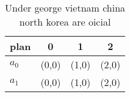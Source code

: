 \documentclass[a4paper]{article}
\begin{document}
\begin{table}
\begin{adjustbox}{width=0.6\columnwidth}
\begin{tabular}{|l|l|l|l|}
\hline
\textbf{plan} & \multicolumn{1}{c|}{\textbf{0}} & \multicolumn{1}{c|}{\textbf{1}} & \multicolumn{1}{c|}{\textbf{2}} \\ \hline
\textbf{$a_0$}  & (0,0) & (1,0) & (2,0) \\ \hline
\textbf{$a_1$}  & (0,0) & (1,0) & (2,0) \\ \hline
\end{tabular}
\end{adjustbox}
\caption{Under george vietnam china north korea are oicial
}
\end{table}
\end{document}
